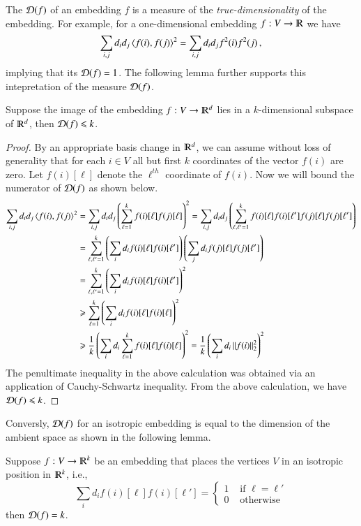 \documentclass[11pt]{article}
\newcommand{\trudim}{\cD}
\begin{document}
The  $\trudim(f)$ of an embedding $f$ is a measure of the
{\em true-dimensionality} of the embedding.  
%
For example, for a one-dimensional embedding $f: V \to \R$ we have
\[ \sum_{i,j} d_i d_j \left\langle f(i),f(j)\right\rangle^2 = \sum_{i,j} d_i d_j  f^2(i)f^2(j)  \,, \] 
implying that its  $\trudim(f) = 1$.  
%
The following lemma further supports this intepretation of the measure $\trudim(f)$.
%
\begin{lemma}
Suppose the image of the embedding $f: V \to \R^d$ lies in a
$k$-dimensional subspace of $\R^d$, then $\trudim(f) \leq k$. 
\end{lemma}
%
\begin{proof}
By an appropriate basis change in $\R^d$, we can assume without loss of
generality that for each $i \in V$ all but first $k$ coordinates of
the vector $f(i)$ are zero.  
%
Let $f(i)[\ell]$ denote the $\ell^{th}$ coordinate of $f(i)$.  Now we will bound the numerator of $\trudim(f)$
as shown below.
%
\begin{align}
\sum_{i,j} d_i d_j \inprod{f(i),f(j)}^2  & = \sum_{i,j} d_i d_j \paren{ \sum_{\ell = 1}^k f(i)[\ell]f(j)[\ell]}^2 
 = \sum_{i,j} d_i d_j \paren{ \sum_{\ell, \ell' = 1}^k f(i)[\ell]f(i)[\ell']  f(j)[\ell]f(j)[\ell'] }  \nonumber \\
& =  \sum_{\ell, \ell' = 1}^k \paren{\sum_{i} d_i f(i)[\ell]f(i)[\ell'] } \paren{\sum_{j} d_i f(j)[\ell]f(j)[\ell'] } \nonumber \\ 
%
& =  \sum_{\ell, \ell' = 1}^k \paren{ \sum_{i} d_i f(i)[\ell]f(i)[\ell'] }^2  \label{eq:2121} \\
%
&  \geq  \sum_{\ell=1}^k \paren{\sum_{i} d_i f(i)[\ell]f(i)[\ell] }^2  \nonumber \\
%
&  \geq \frac{1}{k}   \paren{\sum_{i} d_i \sum_{\ell=1}^k f(i)[\ell]f(i)[\ell] }^2 =  \frac{1}{k}
\paren{\sum_{i} d_i \norm{f(i)}_2^2 }^2 \nonumber
%
\end{align}
%
The penultimate inequality in the above calculation was obtained via
an application of Cauchy-Schwartz inequality.  
%
From the above calculation, we have $\trudim(f) \leq k$.
%
\end{proof}
%
Conversly, $\trudim(f)$ for an isotropic embedding is equal to the
dimension of the ambient space as shown in the following lemma.
%
\begin{lemma}
Suppose $f: V \to \R^k$ be an embedding that places the vertices $V$ in an isotropic position in $\R^k$, i.e.,
\begin{equation}
	\sum_{i} d_i  f(i)[\ell] f(i)[\ell']  = \begin{cases} 1 & \textrm{ if } \ell = \ell' \\ 
			0 & \textrm{ otherwise }  \end{cases} 
	\label{eq:isotropy}
\end{equation}
		then $\trudim(f) = k$.
\end{lemma}
\end{document}

